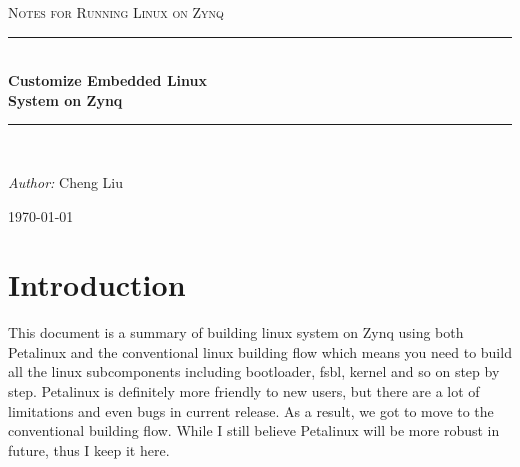 \documentclass[12pt]{article} %
\begin{document}

\begin{titlepage}

\newcommand{\HRule}{\rule{\linewidth}{0.5mm}} %

\center %

\textsc{Notes for Running Linux on Zynq}\\[1.5cm] %

\HRule \\[0.2cm]
{ \fontsize{20pt}{20pt} \bfseries Customize Embedded Linux \\[0.2cm] System on Zynq} \\[0.2cm] %
\HRule \\[1.5cm]

\begin{minipage}{0.4\textwidth}
\begin{center} \large
\emph{Author:} Cheng Liu %
\end{center}
\end{minipage}

\vspace{1cm}
{\large \today}\\[3cm] %

\vfill %

\end{titlepage}


\tableofcontents %

\newpage %

\section{Introduction} %
This document is a summary of building linux system on Zynq using both Petalinux and the 
conventional linux building flow which means you need to build all the linux subcomponents 
including bootloader, fsbl, kernel and so on step by step. Petalinux is definitely more friendly 
to new users, but there are a lot of limitations and even bugs in current release. 
As a result, we got to move to the conventional building flow. While I still believe 
Petalinux will be more robust in future, thus I keep it here.
\end{document}
